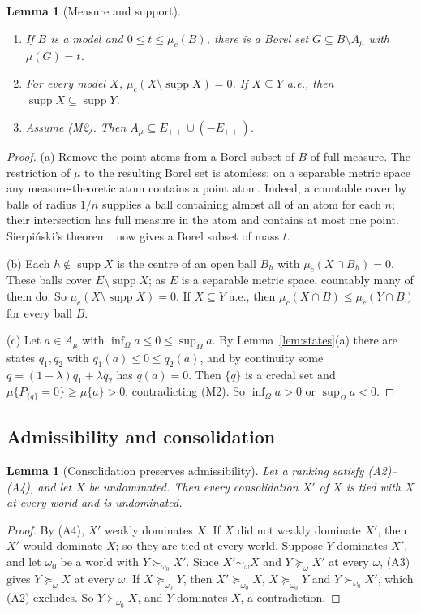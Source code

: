\documentclass[11pt]{article}
\newtheorem{lemma}[theorem]{Lemma}
\theoremstyle{definition}
\newcommand{\Epp}{E_{++}}
\DeclareMathOperator{\supp}{supp}
\begin{document}
\begin{lemma}[Measure and support]\label{lem:measurefacts}
\begin{enumerate}[label=(\alph*)]
\item If $B$ is a model and $0\le t\le\mu_c(B)$, there is a Borel set $G\subseteq B\setminus A_\mu$ with $\mu(G)=t$.
\item For every model $X$, $\mu_c(X\setminus\supp X)=0$. If $X\subseteq Y$ a.e., then $\supp X\subseteq\supp Y$.
\item Assume (M2). Then $A_\mu\subseteq\Epp\cup(-\Epp)$.
\end{enumerate}
\end{lemma}
\begin{proof}
(a) Remove the point atoms from a Borel subset of $B$ of full measure. The restriction of $\mu$ to the resulting Borel set is atomless: on a separable metric space any measure-theoretic atom contains a point atom. Indeed, a countable cover by balls of radius $1/n$ supplies a ball containing almost all of an atom for each $n$; their intersection has full measure in the atom and contains at most one point. Sierpi\'nski's theorem~\cite{Sierpinski} now gives a Borel subset of mass $t$.

(b) Each $h\notin\supp X$ is the centre of an open ball $B_h$ with $\mu_c(X\cap B_h)=0$. These balls cover $E\setminus\supp X$; as $E$ is a separable metric space, countably many of them do. So $\mu_c(X\setminus\supp X)=0$. If $X\subseteq Y$ a.e., then $\mu_c(X\cap B)\le\mu_c(Y\cap B)$ for every ball $B$.

(c) Let $a\in A_\mu$ with $\inf_\Omega a\le0\le\sup_\Omega a$. By Lemma~\ref{lem:states}(a) there are states $q_1,q_2$ with $q_1(a)\le0\le q_2(a)$, and by continuity some $q=(1-\lambda)q_1+\lambda q_2$ has $q(a)=0$. Then $\{q\}$ is a credal set and $\mu\{P_{\{q\}}=0\}\ge\mu\{a\}>0$, contradicting (M2). So $\inf_\Omega a>0$ or $\sup_\Omega a<0$.
\end{proof}

\subsection{Admissibility and consolidation}

\begin{lemma}[Consolidation preserves admissibility]\label{lem:consolidation}
Let a ranking satisfy (A2)--(A4), and let $X$ be undominated. Then every consolidation $X'$ of $X$ is tied with $X$ at every world and is undominated.
\end{lemma}
\begin{proof}
By (A4), $X'$ weakly dominates $X$. If $X$ did not weakly dominate $X'$, then $X'$ would dominate $X$; so they are tied at every world. Suppose $Y$ dominates $X'$, and let $\omega_0$ be a world with $Y\succ_{\omega_0}X'$. Since $X'\sim_\omega X$ and $Y\succeq_\omega X'$ at every $\omega$, (A3) gives $Y\succeq_\omega X$ at every $\omega$. If $X\succeq_{\omega_0}Y$, then $X'\succeq_{\omega_0}X$, $X\succeq_{\omega_0}Y$ and $Y\succ_{\omega_0}X'$, which (A2) excludes. So $Y\succ_{\omega_0}X$, and $Y$ dominates $X$, a contradiction.
\end{proof}
\end{document}
